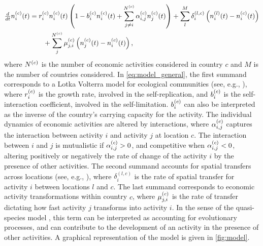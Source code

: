 \begin{equation}\label{eq:model_general}
  \begin{split}
    \tfrac{d}{dt} n_i^{(c)}(t)  &= r_i^{(c)}  n_i^{(c)}(t) \left(1 -   b_i^{(c)}  n_i^{(c)}(t)  + \sum_{j \neq i}^{N^{(c)}} \alpha^{(c)} _{i,j} n_j^{(c)}(t) \right) + \sum_l^M \delta^{(l,c)}_{i} \left( n_i^{(l)}(t) - n_i^{(c)}(t)  \right) \\
    &\qquad + \sum_j^{N^{(c)}} \mu^{(c)} _{j,i}\left( n_j^{(c)}(t)  - n_i^{(c)}(t)  \right),
  \end{split}
\end{equation}
where $N^{(c)}$ is the number of economic activities considered in country $c$ and $M$ is the number of countries considered.
% 
In \cref{eq:model_general}, the first summand corresponds to a Lotka Volterra model for ecological communities (see, e.g., \cite{Bunin2017,Scheffer2006a,Case1990}), where  $r_i^{(c)} $ is the growth rate, involved in the self-replication, and $b_i^{(c)} $ is the self-interaction coefficient, involved in the self-limitation. $b_i^{(c)} $ can also be interpreted as the inverse of the country's carrying capacity for the activity. %
%
The individual dynamics of economic activities are altered by interactions, where $\alpha_{i,j}^{(c)} $ captures the interaction between activity $ i $ and activity $ j $ at location $c$. The interaction between $i$ and $j$ is mutualistic if $\alpha_{i,j}^{(c)}  > 0$, and competitive when $\alpha_{i,j}^{(c)}  < 0$, altering positively or negatively the rate of change of the activity $i$ by the presence of other activities.
%
The second summand accounts for spatial transfers across locations (see, e.g., \cite{Tilman1994b}), where $\delta^{(l,c)}_{i}$ is the rate of spatial transfer for activity $i$ between locations $l$ and $c$.
% 
The last summand corresponds to economic activity transformations within country $c$, where $\mu^{(c)} _{j,i}$ is the rate of transfer dictating how fast activity $j$ transforms into activity $i$. In the sense of the quasi-species model \citep{eigen1988molecular}, this term can be interpreted as accounting for evolutionary processes, and can contribute to the development of an activity in the presence of other activities.
%
A graphical representation of the model is given in \cref{fig:model}.

